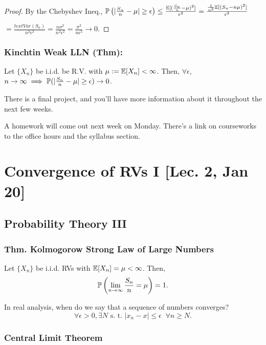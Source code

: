 \begin{proof}
By the Chebyshev Ineq., $\mathbb{P}\left( |\frac{S_n}{n} - \mu| \geq \epsilon \right)
	\leq \frac{\mathbb{E}[(\frac{S_n}{n} - \mu)^2] }{ \epsilon^2 }
= \frac{  \frac{1}{n^2} \mathbb{E}[(S_n - n\mu)^2] }{ \epsilon^2 } $

$= \frac{text{Var} (S_n) }{ n^2\epsilon^2 } = \frac{n\sigma^2}{ n^2\epsilon^2} = \frac{\sigma^2}{n\epsilon^2} \to 0$.
\end{proof}

\subsubsection*{Kinchtin Weak LLN (Thm):} Let $\{ X_n\}$ be i.i.d. be R.V. with $\mu := \mathbb{E}[X_n] < \infty$. Then, $\forall \epsilon,$ $n\to \infty \implies \mathbb{P}(|\frac{S_n}{n} - \mu| \geq \epsilon) \to 0$.



\begin{note}
There is a final project, and you'll have more information about it throughout the next few weeks.

A homework will come out next week on Monday. There's a link on courseworks to the office hours and the syllabus section.
\end{note}

\section{Convergence of RVs I [Lec. 2, Jan 20]}

\subsection{Probability Theory III}

\subsubsection*{Thm. Kolmogorow Strong Law of Large Numbers}

Let $\{ X_n\}$ be i.i.d. RVs with $\mathbb{E}[X_n] = \mu < \infty$. Then, 
\[ 
	\mathbb{P} \left( \lim\limits_{n\to\infty} \dfrac{S_n}{n} = \mu \right) = 1.
\]

In real analysis, when do we say that a sequence of numbers converges? 
\[ \forall \epsilon > 0 , \exists N \text{ s. t. } |x_n - x| \leq \epsilon \;\; \forall n\geq N. \]

\subsubsection*{Central Limit Theorem} 

